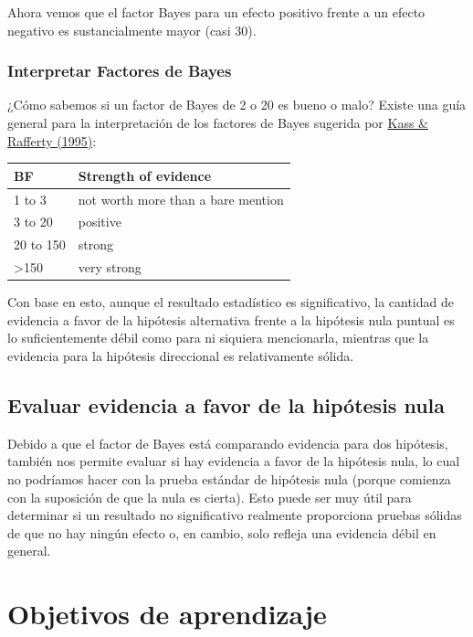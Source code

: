 \documentclass[
  12pt,
]{book}
\begin{document}
Ahora vemos que el factor Bayes para un efecto positivo frente a un efecto negativo es sustancialmente mayor (casi 30).

\hypertarget{interpretar-factores-de-bayes}{%
\subsubsection{Interpretar Factores de Bayes}\label{interpretar-factores-de-bayes}}

¿Cómo sabemos si un factor de Bayes de 2 o 20 es bueno o malo? Existe una guía general para la interpretación de los factores de Bayes sugerida por \href{https://www.andrew.cmu.edu/user/kk3n/simplicity/KassRaftery1995.pdf}{Kass \& Rafferty (1995)}:

\begin{longtable}[]{@{}ll@{}}
\toprule
BF & Strength of evidence \\
\midrule
\endhead
1 to 3 & not worth more than a bare mention \\
3 to 20 & positive \\
20 to 150 & strong \\
\textgreater150 & very strong \\
\bottomrule
\end{longtable}

Con base en esto, aunque el resultado estadístico es significativo, la cantidad de evidencia a favor de la hipótesis alternativa frente a la hipótesis nula puntual es lo suficientemente débil como para ni siquiera mencionarla, mientras que la evidencia para la hipótesis direccional es relativamente sólida.

\hypertarget{evaluar-evidencia-a-favor-de-la-hipuxf3tesis-nula}{%
\subsection{Evaluar evidencia a favor de la hipótesis nula}\label{evaluar-evidencia-a-favor-de-la-hipuxf3tesis-nula}}

Debido a que el factor de Bayes está comparando evidencia para dos hipótesis, también nos permite evaluar si hay evidencia a favor de la hipótesis nula, lo cual no podríamos hacer con la prueba estándar de hipótesis nula (porque comienza con la suposición de que la nula es cierta). Esto puede ser muy útil para determinar si un resultado no significativo realmente proporciona pruebas sólidas de que no hay ningún efecto o, en cambio, solo refleja una evidencia débil en general.

\hypertarget{objetivos-de-aprendizaje-10}{%
\section{Objetivos de aprendizaje}\label{objetivos-de-aprendizaje-10}}
\end{document}
